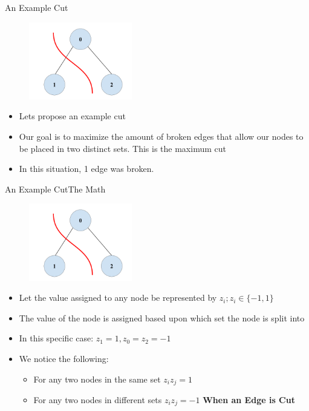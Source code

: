 \begin{frame}{An Example Cut}
    \begin{figure}[h]
    \centering
    \includegraphics[width=0.4\textwidth]{400/Graph_MC_Cut.png}
    
\end{figure}
\begin{itemize}
        \item Lets propose an example cut 
        \item Our goal is to maximize the amount of broken edges that allow our nodes to be placed in two distinct sets. This is the maximum cut
        \item In this situation, 1 edge was broken.
        
    \end{itemize}

    
\end{frame}



\begin{frame}{An Example Cut}{The Math}
    \begin{figure}[h]
    \centering
    \includegraphics[width=0.4\textwidth]{400/Graph_MC_Cut.png}
    \end{figure}
    \vspace{-4mm}
    \begin{itemize}
    \item Let the value assigned to any node be represented by $z_i; z_i \in \{-1,1\}$
    \item The value of the node is assigned based upon which set the node is split into
    \item In this specific case: $z_1 = 1, z_0 = z_2 = -1$
    \item We notice the following: 
    \begin{itemize}
        \item For any two nodes in the same set $z_i z_j = 1$
        \item For any two nodes in different sets $z_i z_j = -1$ \textbf{When an Edge is Cut}
    \end{itemize}
\end{itemize}
\end{frame}

